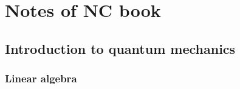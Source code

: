 \documentclass[
	11pt, %
	fleqn, %
	a4paper, %
]{LegrandOrangeBook}
\begin{document}


\pagestyle{empty} %

\tableofcontents %



\pagestyle{fancy} %

\cleardoublepage %


\chapterspaceabove{6.75cm} %
\chapterspacebelow{7.25cm} %


 



\part{Notes of NC book}

\chapter{Introduction to quantum mechanics}

\section{Linear algebra}
\end{document}
